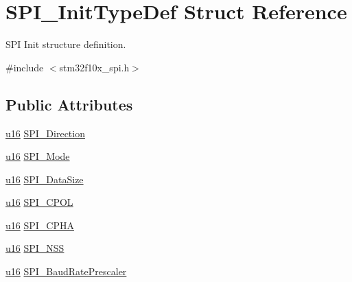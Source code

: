 \hypertarget{struct_s_p_i___init_type_def}{}\section{S\+P\+I\+\_\+\+Init\+Type\+Def Struct Reference}
\label{struct_s_p_i___init_type_def}


S\+PI Init structure definition.  




{\ttfamily \#include $<$stm32f10x\+\_\+spi.\+h$>$}

\subsection*{Public Attributes}
\begin{DoxyCompactItemize}
\item 
\hyperlink{agilefox_2library_2inc_2stm32f10x__type_8h_a9e6c91d77e24643b888dbd1a1a590054}{u16} \hyperlink{struct_s_p_i___init_type_def_a12fb83160740b0cf952ff7fd011086a6}{S\+P\+I\+\_\+\+Direction}
\item 
\hyperlink{agilefox_2library_2inc_2stm32f10x__type_8h_a9e6c91d77e24643b888dbd1a1a590054}{u16} \hyperlink{struct_s_p_i___init_type_def_a9df59619a50a3ce9c3cf23e6e04fe9ec}{S\+P\+I\+\_\+\+Mode}
\item 
\hyperlink{agilefox_2library_2inc_2stm32f10x__type_8h_a9e6c91d77e24643b888dbd1a1a590054}{u16} \hyperlink{struct_s_p_i___init_type_def_a0e66cfa859e4ea82b4f6128548802a6d}{S\+P\+I\+\_\+\+Data\+Size}
\item 
\hyperlink{agilefox_2library_2inc_2stm32f10x__type_8h_a9e6c91d77e24643b888dbd1a1a590054}{u16} \hyperlink{struct_s_p_i___init_type_def_a88634bd8cb69b459fec84d421affa14d}{S\+P\+I\+\_\+\+C\+P\+OL}
\item 
\hyperlink{agilefox_2library_2inc_2stm32f10x__type_8h_a9e6c91d77e24643b888dbd1a1a590054}{u16} \hyperlink{struct_s_p_i___init_type_def_ae6552fad0ed194463d62e93e658c78e1}{S\+P\+I\+\_\+\+C\+P\+HA}
\item 
\hyperlink{agilefox_2library_2inc_2stm32f10x__type_8h_a9e6c91d77e24643b888dbd1a1a590054}{u16} \hyperlink{struct_s_p_i___init_type_def_a9234e09656fe5c6805ed18a25681e6cb}{S\+P\+I\+\_\+\+N\+SS}
\item 
\hyperlink{agilefox_2library_2inc_2stm32f10x__type_8h_a9e6c91d77e24643b888dbd1a1a590054}{u16} \hyperlink{struct_s_p_i___init_type_def_af3e17db1e786d36898d9d7389e5a41e0}{S\+P\+I\+\_\+\+Baud\+Rate\+Prescaler}
\item 

\end{DoxyCompactItemize}
